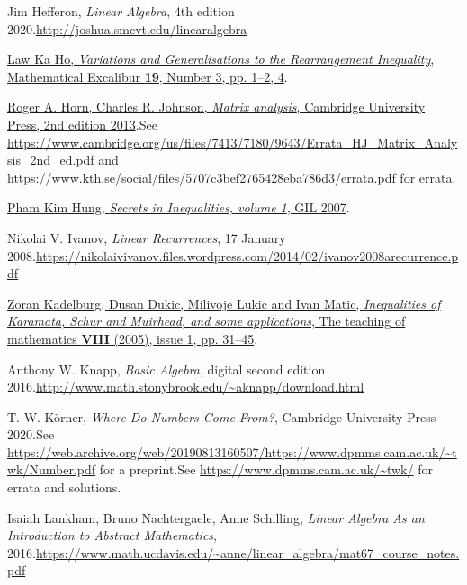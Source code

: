 \documentclass[numbers=enddot,12pt,final,onecolumn,notitlepage]{scrartcl}%
\numberwithin{exer}{subsection}
\theoremstyle{definition}
\begin{document}
\begin{thebibliography}{99999999}
Jim Hefferon, \textit{Linear Algebra}, 4th edition
2020.\newline\url{http://joshua.smcvt.edu/linearalgebra}

%
\href{https://www.math.hkust.edu.hk/excalibur/v19_n3.pdf}{Law Ka Ho,
\textit{Variations and Generalisations to the Rearrangement Inequality},
Mathematical Excalibur \textbf{19}, Number 3, pp. 1--2, 4}.

%
\href{http://www.cse.zju.edu.cn/eclass/attachments/2015-10/01-1446086008-145421.pdf}{Roger
A. Horn, Charles R. Johnson, \textit{Matrix analysis}, Cambridge University
Press, 2nd edition 2013}.\newline See
\url{https://www.cambridge.org/us/files/7413/7180/9643/Errata_HJ_Matrix_Analysis_2nd_ed.pdf}
and \url{https://www.kth.se/social/files/5707c3bef2765428eba786d3/errata.pdf}
for errata.

%
\href{http://refkol.ro/matek/mathbooks/!Books!/Secrets in Inequalities (volume 1) Pham Kim Hung.pdf}{Pham
Kim Hung, \textit{Secrets in Inequalities, volume 1}, GIL 2007}.

Nikolai V. Ivanov, \textit{Linear Recurrences}, 17
January 2008.\newline\url{https://nikolaivivanov.files.wordpress.com/2014/02/ivanov2008arecurrence.pdf}

%
\href{http://elib.mi.sanu.ac.rs/files/journals/tm/14/tm813.pdf}{Zoran
Kadelburg, Dusan Dukic, Milivoje Lukic and Ivan Matic, \textit{Inequalities of
Karamata, Schur and Muirhead, and some applications}, The teaching of
mathematics \textbf{VIII} (2005), issue 1, pp. 31--45}.

Anthony W. Knapp, \textit{Basic Algebra}, digital
second edition 2016.\newline\url{http://www.math.stonybrook.edu/~aknapp/download.html}

T. W. K\"{o}rner, \textit{Where Do Numbers Come
From?}, Cambridge University Press 2020.\newline See
\url{https://web.archive.org/web/20190813160507/https://www.dpmms.cam.ac.uk/~twk/Number.pdf}
for a preprint.\newline See \url{https://www.dpmms.cam.ac.uk/~twk/} for errata
and solutions.

Isaiah Lankham, Bruno Nachtergaele, Anne
Schilling, \textit{Linear Algebra As an Introduction to Abstract Mathematics},
2016.\newline\url{https://www.math.ucdavis.edu/~anne/linear_algebra/mat67_course_notes.pdf}


\end{thebibliography}
\end{document}
